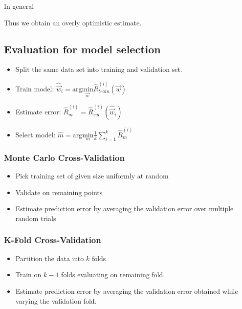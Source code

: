 \documentclass[10pt,a4paper]{scrartcl}
\begin{document}
\begin{multicols*}{2}
In general


Thus we obtain an overly optimistic estimate.

\subsection{Evaluation for model selection}

\begin{itemize}
\item Split the same data set into training and validation set.

\item Train model: $\hat{\vec{w}}_i=\text{arg}\underset{\vec{w}}{\text{min}}\hat{R}_{train}^{(i)}(\vec{w})$
\item Estimate error: $\hat{R}_m^{(i)}=\hat{R}_{val}^{(i)}(\hat{\vec{w}}_i)$
\item Select model: $\hat{m}=\text{arg}\underset{m}{\text{min}}\frac{1}{k}\sum\limits_{i=1}^k\hat{R}_m^{(i)}$
\end{itemize}

\subsubsection{Monte Carlo Cross-Validation}

\begin{itemize}
\item Pick training set of given size uniformly at random
\item Validate on remaining points
\item Estimate prediction error by averaging the validation error over multiple random trials
\end{itemize}

\subsubsection{K-Fold Cross-Validation}

\begin{itemize}
\item Partition the data into $k$ folds
\item Train on $k-1$ folds evaluating on remaining fold.
\item Estimate prediction error by averaging the validation error obtained while varying the validation fold.
\end{itemize}


\end{multicols*}
\end{document}
